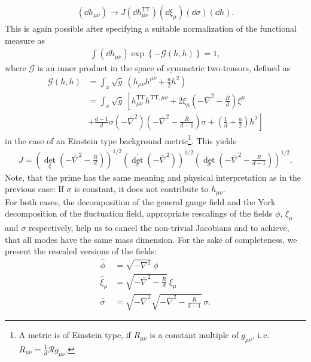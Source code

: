 \begin{align}
	\left(\dd h_{\mu\nu}\right) \longrightarrow J	\left(\dd h_{\mu\nu}^{\mathrm{TT}}\right) \left(\dd\xi_{\mu}\right)\left(\dd\sigma\right)\left(\dd h\right).
\end{align}
This is again possible after specifying a suitable normalization of the functional measure as
\begin{align}
	\int (\dd h_{\mu\nu}) \exp\left\{-\mathcal{G}(h, h)\right\} = 1,
\end{align}
where $\mathcal{G}$ is an inner product in the space of symmetric two-tensors, defined as
\begin{equation}
\begin{aligned} 
\mathcal{G}(h, h)&= \int_x \sqrt{\bar{g}} \ \left(h_{\mu \nu} h^{\mu \nu}+\frac{a}{2} h^{2}\right) \\[10pt]
&= \int_x \sqrt{\bar{g}} \ \left[h^{\mathrm{TT}}_{\mu \nu} h^{\mathrm{TT}, \mu \nu}+2 \xi_{\mu}\left(-\bar{\nabla}^{2}-\frac{\bar{R}}{d}\right) \xi^{\mu}\right. \\
&+\left.\frac{d-1}{d} \sigma\left(-\bar{\nabla}^{2}\right)\left(-\bar{\nabla}^{2}-\frac{\bar{R}}{d-1}\right) \sigma+\left(\frac{1}{d}+\frac{a}{2}\right) h^{2} \right] 
\end{aligned}
\end{equation}
in the case of an Einstein type background metric\footnote{A metric is of Einstein type, if $R_{\mu\nu}$ is a constant multiple of $g_{\mu\nu}$, i.\,e. $R_{\mu\nu} = \frac{1}{d} \mathcal{R} g_{\mu\nu}$.}. This yields
\begin{align}
	J=\left(\operatorname{det}_{\xi}\left(-\bar{\nabla}^{2}-\frac{R}{d}\right)\right)^{1 / 2}\left(\operatorname{det}_{\sigma}^{\prime}\left(-\bar{\nabla}^{2}\right)\right)^{1 / 2}\left(\operatorname{det}_{\sigma}\left(-\bar{\nabla}^{2}-\frac{R}{d-1}\right)\right)^{1 / 2}.
\end{align}
Note, that the prime has the same meaning and physical interpretation as in the previous case: If $\sigma$ is constant, it does not contribute to $h_{\mu\nu}$. \\
 For both cases, the decomposition of the general gauge field and the York decomposition of the fluctuation field, appropriate rescalings of the fields $\phi$, $\xi_{\mu}$ and $\sigma$ respectively, help us to cancel the non-trivial Jacobians and to achieve, that all modes have the same mass dimension. For the sake of completeness, we present the rescaled versions of the fields:
 \begin{align}
\hat{\phi} &= \sqrt{-\nabla^2}\ \phi \\[10pt]
 \hat{\xi}_{\mu} &= \sqrt{-\bar{\nabla}^{2}-\frac{\bar{R}}{d}}\  \xi_{\mu} \\[10pt]
  \hat{\sigma} &= \sqrt{-\bar{\nabla}^{2}} \sqrt{-\bar{\nabla}^{2}-\frac{\bar{R}}{d-1}}\ \sigma. 
 \end{align}
